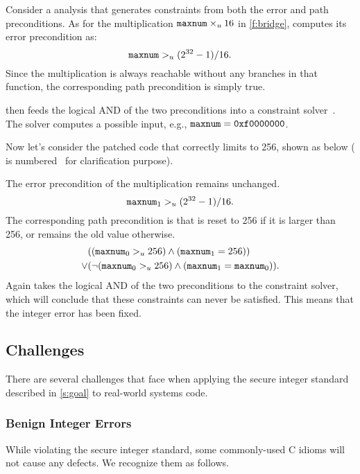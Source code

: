 Consider a \naive analysis that generates constraints from both the
error and path preconditions.  As for the multiplication $\texttt{maxnum}
\times_u 16$ in \autoref{f:bridge}, \sys computes its error
precondition as:
\begin{equation*}
\texttt{maxnum} >_u (2^{32} - 1) / 16.
\end{equation*}
Since the multiplication is always reachable without any branches
in that function, the corresponding path precondition is simply true.

\sys then feeds the logical AND of the two preconditions into a
constraint solver~\cite{boolector}.  The solver computes a possible
input, e.g., $\texttt{maxnum} = \texttt{0xf0000000}$.

Now let's consider the patched code that correctly limits 
to 256, shown as below ( is
numbered~\cite[\chapterautorefname~8.11]{whale} for clarification
purpose).

The error precondition of the multiplication remains unchanged.
\begin{equation*}
\texttt{maxnum}_1 >_u (2^{32} - 1) / 16.
\end{equation*}
The corresponding path precondition is that  is reset to 256
if it is larger than 256, or remains the old value otherwise.
\begin{align*}
& ((\texttt{maxnum}_0 >_u 256) \land (\texttt{maxnum}_1 = 256)) \\
\lor
& (\neg (\texttt{maxnum}_0 >_u 256) \land (\texttt{maxnum}_1 = \texttt{maxnum}_0)).
\end{align*}
Again \sys takes the logical AND of the two preconditions to the
constraint solver, which will conclude that these constraints can
never be satisfied.  This means that the integer error has been
fixed.

\subsection{Challenges}
\label{s:chal}

There are several challenges that face \sys when applying the
secure integer standard described in \autoref{s:goal} to real-world
systems code.

\subsubsection{Benign Integer Errors}

While violating the secure integer standard, some commonly-used C
idioms will not cause any defects.  We recognize them as follows.

